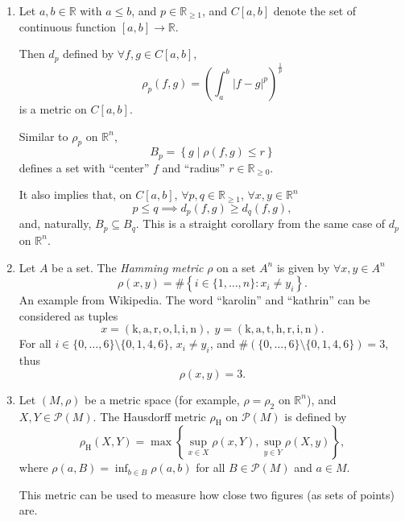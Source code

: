 \begin{example}
\begin{enumerate}
		
		\item Let $a,b \in \mathbb R$ with $a \le b$, and $p \in \mathbb R_{\ge 1}$, and $C[a,b]$ denote the set of continuous function $[a,b] \to \mathbb R$.
		
			Then $d_p$ defined by $\forall f, g \in C[a,b]$,
			$$
			\rho_{p}(f,g) = \left( \int_a^b |f - g|^{p} \right)^\frac{1}{p}
			$$
			is a metric on $C[a,b]$.
			
			
			Similar to $\rho_p$ on $\mathbb R^n$,
			$$
			B_{p} = \left\{ g \;|\; \rho(f, g) \le r \right\}
			$$
			defines a set with ``center'' $f$ and ``radius'' $r \in \mathbb R_{\ge 0}$.
			
			It also implies that, on $C[a,b]$, $\forall p, q \in \mathbb R_{\ge 1}$, $\forall x,y \in \mathbb R^n$
			$$
			p \le q \implies d_p(f,g) \ge d_q(f,g),
			$$
			and, naturally, $B_p \subseteq B_q$. This is a straight corollary from the same case of $d_p$ on $\mathbb R^n$.
		
		
		\item Let $A$ be a set. The \textit{Hamming metric} $\rho$ on a set $A^n$ is given by $\forall x,y \in A^n$
			$$
			\rho(x,y) = \# \left\{ i \in \{1, \ldots, n\} : x_i \ne y_i \right\}.
			$$
			An example from Wikipedia. The word ``karolin'' and ``kathrin'' can be considered as tuples
			$$
			x = ( \mathrm{ k, a, r, o, l, i, n } ), \; y = ( \mathrm{k, a, t, h, r, i, n} ).
			$$
			For all $i \in \{0, \ldots, 6\} \setminus \{ 0, 1, 4, 6 \}$, $x_i \ne y_i$, and $\# (\{0, \ldots, 6\} \setminus \{ 0, 1, 4, 6 \}) = 3$, thus
			$$
			\rho(x,y) = 3.
			$$
		
		
		\item Let $(M, \rho)$ be a metric space (for example, $\rho = \rho_2$ on $\mathbb R^n$), and $X, Y \in \mathcal P(M)$. The Hausdorff metric $\rho_\mathrm{H}$ on $\mathcal P(M)$ is defined by
			$$
			\rho_\mathrm{H}(X,Y) = \max \left\{ \sup_{x \in X} \rho(x,Y), \sup_{y \in Y} \rho(X,y) \right\},
			$$
			where $\rho(a, B) = \inf_{b \in B} \rho(a,b)$ for all $B \in \mathcal P(M)$ and $a \in M$.
			
			This metric can be used to measure how close two figures (as sets of points) are.
	\end{enumerate}
\end{example}



